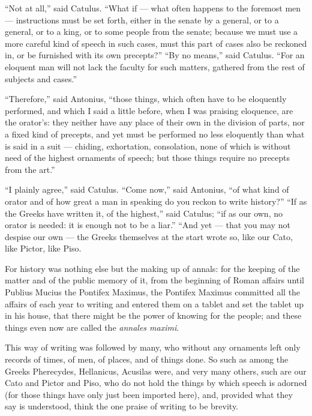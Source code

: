  ``Not at all,'' said Catulus. ``What if — what often happens to the foremost men — instructions must be set forth, either in the senate by a general, or to a general, or to a king, or to some people from the senate; because we must use a more careful kind of speech in such cases, must this part of cases also be reckoned in, or be furnished with its own precepts?'' ``By no means,'' said Catulus. ``For an eloquent man will not lack the faculty for such matters, gathered from the rest of subjects and cases.''

 ``Therefore,'' said Antonius, ``those things, which often have to be eloquently performed, and which I said a little before, when I was praising eloquence, are the orator's: they neither have any place of their own in the division of parts, nor a fixed kind of precepts, and yet must be performed no less eloquently than what is said in a suit — chiding, exhortation, consolation, none of which is without need of the highest ornaments of speech; but those things require no precepts from the art.''

 ``I plainly agree,'' said Catulus. ``Come now,'' said Antonius, ``of what kind of orator and of how great a man in speaking do you reckon to write history?'' ``If as the Greeks have written it, of the highest,'' said Catulus; ``if as our own, no orator is needed: it is enough not to be a liar.'' ``And yet — that you may not despise our own — the Greeks themselves at the start wrote so, like our Cato, like Pictor, like Piso.

 For history was nothing else but the making up of annals: for the keeping of the matter and of the public memory of it, from the beginning of Roman affairs until Publius Mucius the Pontifex Maximus, the Pontifex Maximus committed all the affairs of each year to writing and entered them on a tablet and set the tablet up in his house, that there might be the power of knowing for the people; and these things even now are called the \textit{annales maximi}.

 This way of writing was followed by many, who without any ornaments left only records of times, of men, of places, and of things done. So such as among the Greeks Pherecydes, Hellanicus, Acusilas were, and very many others, such are our Cato and Pictor and Piso, who do not hold the things by which speech is adorned (for those things have only just been imported here), and, provided what they say is understood, think the one praise of writing to be brevity.

